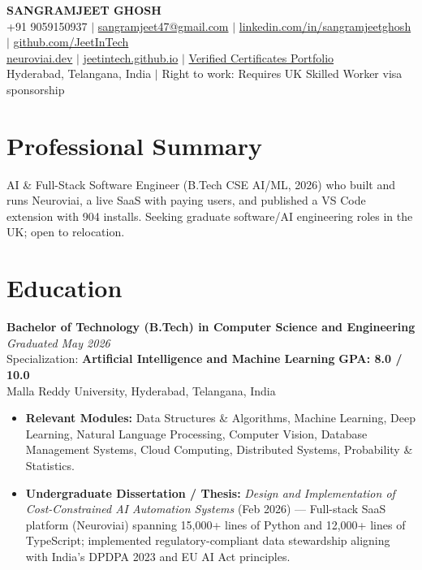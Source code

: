 \documentclass[9.5pt]{article}
\begin{document}
\begin{center}
{\LARGE \textbf{SANGRAMJEET GHOSH}} \\[5pt]
{\normalsize
  +91 9059150937 \quad $|$ \quad
  \href{mailto:sangramjeet47@gmail.com}{sangramjeet47@gmail.com} \quad $|$ \quad
  \href{https://www.linkedin.com/in/sangramjeetghosh}{linkedin.com/in/sangramjeetghosh} \quad $|$ \quad
  \href{https://github.com/JeetInTech}{github.com/JeetInTech}
}\\[3pt]
{\normalsize
  \href{https://neuroviai.dev}{neuroviai.dev} \quad $|$ \quad
  \href{https://jeetintech.github.io}{jeetintech.github.io} \quad $|$ \quad
  \href{https://drive.google.com/drive/folders/1ZQd-DeX-rXlEVDTwDJfjLjnG7iPc_fEw}{Verified Certificates Portfolio}
}\\[2pt]
{\small Hyderabad, Telangana, India \quad $|$ \quad Right to work: Requires UK Skilled Worker visa sponsorship}
\end{center}

\vspace{1pt}

\section*{Professional Summary}
AI \& Full-Stack Software Engineer (B.Tech CSE AI/ML, 2026) who built and runs Neuroviai, a live SaaS with paying users, and published a VS Code extension with 904 installs. Seeking graduate software/AI engineering roles in the UK; open to relocation.

\section*{Education}

\textbf{Bachelor of Technology (B.Tech) in Computer Science and Engineering} \hfill \textit{Graduated May 2026} \\
Specialization: \textbf{Artificial Intelligence and Machine Learning} \hfill \textbf{GPA: 8.0 / 10.0} \\
Malla Reddy University, Hyderabad, Telangana, India

\begin{itemize}
  \item \textbf{Relevant Modules:} Data Structures \& Algorithms, Machine Learning, Deep Learning, Natural Language Processing, Computer Vision, Database Management Systems, Cloud Computing, Distributed Systems, Probability \& Statistics.
  \item \textbf{Undergraduate Dissertation / Thesis:} \textit{Design and Implementation of Cost-Constrained AI Automation Systems} (Feb 2026) --- Full-stack SaaS platform (Neuroviai) spanning 15,000+ lines of Python and 12,000+ lines of TypeScript; implemented regulatory-compliant data stewardship aligning with India's DPDPA 2023 and EU AI Act principles.
\end{itemize}
\end{document}
